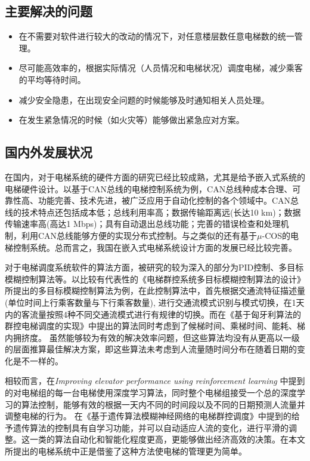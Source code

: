 \subsection{主要解决的问题}
\begin{itemize}
	\item 在不需要对软件进行较大的改动的情况下，对任意楼层数任意电梯数的统一管理。
	\item 尽可能高效率的，根据实际情况（人员情况和电梯状况）调度电梯，减少乘客的平均等待时间。
	\item 减少安全隐患，在出现安全问题的时候能够及时通知相关人员处理。
	\item 在发生紧急情况的时候（如火灾等）能够做出紧急应对方案。
\end{itemize}

\subsection{国内外发展状况}
在国内，对于电梯系统的硬件方面的研究已经比较成熟，尤其是给予嵌入式系统的电梯硬件设计。以基于CAN总线的电梯控制系统为例，CAN总线种成本合理、可靠性高、功能完善、技术先进，被广泛应用于自动化控制的各个领域中。CAN总线的技术特点还包括成本低；总线利用率高；数据传输距离远(长达10 km)；数据传输速率高(高达1 Mbps)；具有自动退出总线功能；完善的错误检查和处理机制，利用CAN总线能够方便的实现分布式控制\cite{ARMbasedElevatorControl}。与之类似的还有基于$\mu$-COS的电梯控制系统。总而言之，我国在嵌入式电梯系统设计方面的发展已经比较完善。\par

对于电梯调度系统软件的算法方面，被研究的较为深入的部分为PID控制、多目标模糊控制算法等。以比较有代表性的《电梯群控系统多目标模糊控制算法的设计》所提出的多目标模糊控制算法为例，在此控制算法中，首先根据交通流特征描述量(单位时间上行乘客数量与下行乘客数量), 进行交通流模式识别与模式切换，在1天内的客流量按照4种不同交通流模式进行有规律的切换\cite{multiTargetVagueAlogrithm}。而在《基于匈牙利算法的群控电梯调度的实现》中提出的算法同时考虑到了候梯时间、乘梯时间、能耗、梯内拥挤度\cite{hungaryAlogrithm}。 虽然能够较为有效的解决效率问题，但这些算法均没有从更高以一级的层面推算最佳解决方案，即这些算法未考虑到人流量随时间分布在随着日期的变化是不一样的。 \par

相较而言，在{\emph{Improving elevator performance using reinforcement learning}} 中提到的对电梯组的每一台电梯使用深度学习算法，同时整个电梯组接受一个总的深度学习的算法控制，能够有效的根据一天内不同的时间段以及不同的日期预测人流量并调整电梯的行为\cite{reinforcemantLearning}。 在《基于遗传算法模糊神经网络的电梯群控调度》中提到的给予遗传算法的控制具有自学习功能，并可以自动适应人流的变化，进行平滑的调整\cite{geneticAndNutritionAlogrithm}。这一类的算法自动化和智能化程度更高，更能够做出经济高效的决策。在本文所提出的电梯系统中正是借鉴了这种方法使电梯的管理更为简单。


